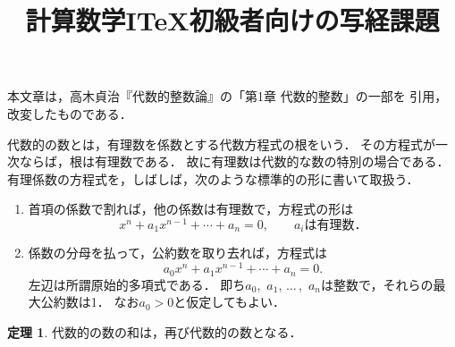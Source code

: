 \documentclass{jsarticle}
\title{計算数学I\quad \TeX 初級者向けの写経課題}
\theoremstyle{definition}
\newtheorem*{thm}{定理}
\begin{document}
\maketitle

本文章は，高木貞治『代数的整数論』の「第1章 代数的整数」の一部を
引用，改変したものである．

\bigskip

代数的の数とは，有理数を係数とする代数方程式の根をいう．
その方程式が一次ならば，根は有理数である．
故に有理数は代数的な数の特別の場合である．
有理係数の方程式を，しばしば，次のような標準的の形に書いて取扱う．

\begin{enumerate}
\renewcommand{\labelenumi}{(\arabic{enumi}${}^\circ$)}
\item 首項の係数で割れば，他の係数は有理数で，方程式の形は
  \[
    x^n+a_1x^{n-1}+\cdots+a_n=0,\qquad \text{$a_i$は有理数．}
  \]
\item 係数の分母を払って，公約数を取り去れば，方程式は
  \[
    a_0x^n+a_1x^{n-1}+\cdots+a_n=0.
  \]
  左辺は所謂原始的多項式である．
  即ち$a_0$,~$a_1$, $\ldots\,$,~$a_n$は整数で，それらの最大公約数は1．
  なお$a_0>0$と仮定してもよい．
\end{enumerate}

\begin{thm}
代数的の数の和は，再び代数的の数となる．
\end{thm}
\end{document}
